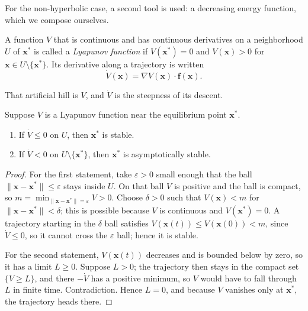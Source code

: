 For the non-hyperbolic case, a second tool is used: a decreasing energy function, which we
compose ourselves.

\begin{definisi}
A function $V$ that is continuous and has continuous derivatives on a neighborhood $U$ of
$\mathbf{x}^{*}$ is called a \emph{Lyapunov function} if $V(\mathbf{x}^{*})=0$ and
$V(\mathbf{x})>0$ for $\mathbf{x}\in U\setminus\{\mathbf{x}^{*}\}$. Its derivative along a
trajectory is written
\[
\dot V(\mathbf{x})=\nabla V(\mathbf{x})\cdot\mathbf{f}(\mathbf{x}).
\]
\end{definisi}

That artificial hill is $V$, and $\dot V$ is the steepness of its descent.

\begin{teorema}
Suppose $V$ is a Lyapunov function near the equilibrium point $\mathbf{x}^{*}$.
\begin{enumerate}
\item If $\dot V\le0$ on $U$, then $\mathbf{x}^{*}$ is stable.
\item If $\dot V<0$ on $U\setminus\{\mathbf{x}^{*}\}$, then
  $\mathbf{x}^{*}$ is asymptotically stable.
\end{enumerate}
\end{teorema}

\begin{proof}
For the first statement, take $\varepsilon>0$ small enough that the ball
$\|\mathbf{x}-\mathbf{x}^{*}\|\le\varepsilon$ stays inside $U$. On that ball
$V$ is positive and the ball is compact, so
$m=\min_{\|\mathbf{x}-\mathbf{x}^{*}\|=\varepsilon}V>0$. Choose $\delta>0$
such that $V(\mathbf{x})<m$ for $\|\mathbf{x}-\mathbf{x}^{*}\|<\delta$;
this is possible because $V$ is continuous and $V(\mathbf{x}^{*})=0$. A trajectory starting
in the $\delta$ ball satisfies $V(\mathbf{x}(t))\le V(\mathbf{x}(0))<m$, since $\dot V\le0$,
so it cannot cross the $\varepsilon$ ball; hence it is stable.

For the second statement, $V(\mathbf{x}(t))$ decreases and is bounded below by
zero, so it has a limit $L\ge0$. Suppose $L>0$; the trajectory then stays in the compact set
$\{V\ge L\}$, and there $-\dot V$ has a positive minimum, so $V$ would have to fall through
$L$ in finite time. Contradiction. Hence $L=0$, and because $V$ vanishes only at
$\mathbf{x}^{*}$, the trajectory heads there.
\end{proof}

